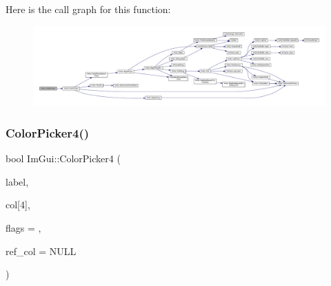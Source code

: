 Here is the call graph for this function\+:
\nopagebreak
\begin{figure}[H]
\begin{center}
\leavevmode
\includegraphics[width=350pt]{namespace_im_gui_a2a2a98cb9a17b18702be6b954670b388_cgraph}
\end{center}
\end{figure}
\mbox{\label{namespace_im_gui_a3d5aae9e0a14aa051d5a799abbe97b32}} 
\subsubsection{\texorpdfstring{Color\+Picker4()}{ColorPicker4()}}
{\footnotesize\ttfamily bool Im\+Gui\+::\+Color\+Picker4 (\begin{DoxyParamCaption}\item[{const char $\ast$}]{label,  }\item[{float}]{col\mbox{[}4\mbox{]},  }\item[{\mbox{\hyperlink{imgui_8h_a6b2d5e95adc38f22c021252189f669c6}{Im\+Gui\+Color\+Edit\+Flags}}}]{flags = {},  }\item[{const float $\ast$}]{ref\+\_\+col = {\ttfamily NULL} }\end{DoxyParamCaption})}

